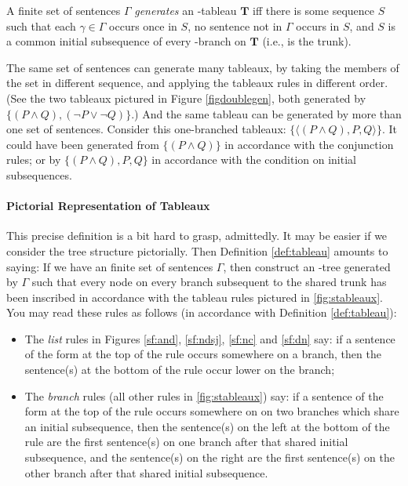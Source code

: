 \begin{definition} \label{def:gentabl}
	A finite set of sentences $\Gamma$ \emph{generates} an \lone-tableau $\mathbf{T}$ iff there is some sequence $S$ such that each $\gamma\in \Gamma$ occurs once in $S$, no sentence not in $\Gamma$ occurs in $S$, and $S$ is a common initial subsequence of every \lone-branch on $\mathbf{T}$ (i.e., is the trunk). 
\end{definition}
The same set of sentences can generate many tableaux, by taking the members of the set in different sequence, and applying the tableaux rules in different order. (See the two tableaux pictured in Figure \ref{figdoublegen}, both generated by $\{(P\wedge Q),(¬P\vee ¬Q)\}$.) And the same tableau can be generated by more than one set of sentences. Consider this one-branched tableaux: $\{\langle (P\wedge Q), P, Q \rangle\}$. It could have been generated from $\{(P \wedge Q)\}$ in accordance with the conjunction rules; or by $\{(P\wedge Q), P, Q\}$ in accordance with the condition on initial subsequences. 

\paragraph{Pictorial Representation of Tableaux} This precise definition is a bit hard to grasp, admittedly. It may be easier if we consider the tree structure pictorially. Then Definition \ref{def:tableau} amounts to saying: If we have an finite set of sentences $\Gamma$, then construct an \lone-tree generated by $\Gamma$ such that every node on every branch subsequent to the shared trunk has been inscribed in accordance with the tableau rules pictured in \autoref{fig:stableaux}. You may read these rules as follows (in accordance with Definition \ref{def:tableau}): \begin{itemize}
	\item The \emph{list} rules in Figures \ref{sf:and}, \ref{sf:ndsj}, \ref{sf:nc} and \ref{sf:dn} say: if a sentence of the form at the top of the rule occurs somewhere on a branch, then the sentence(s) at the bottom of the rule occur lower on the branch;
	\item The \emph{branch} rules (all other rules in \autoref{fig:stableaux}) say: if a sentence of the form at the top of the rule occurs somewhere on on two branches which share an initial subsequence, then the sentence(s) on the left at the bottom of the rule are the first sentence(s) on one branch after that shared initial subsequence, and the sentence(s) on the right are the first sentence(s) on the other branch after that shared initial subsequence.
\end{itemize}

